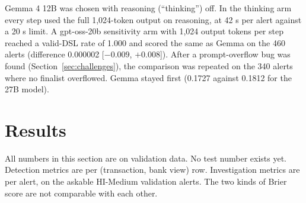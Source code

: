 \documentclass[11pt,a4paper]{article}
\begin{document}
\begin{table}[!htbp]
\centering\small
{}
\caption{Backbone sweep E18 on HI-Medium validation alerts. Brier is per alert.}
\label{tab:e18}
\end{table}

Gemma 4 12B was chosen with reasoning (``thinking'') off. In the thinking arm every step used the full 1,024-token output on reasoning, at 42 s per alert against a 20 s limit. A gpt-oss-20b sensitivity arm with 1,024 output tokens per step reached a valid-DSL rate of 1.000 and scored the same as Gemma on the 460 alerts (difference 0.000002 [$-0.009$, $+0.008$]). After a prompt-overflow bug was found (Section~\ref{sec:challenges}), the comparison was repeated on the 340 alerts where no finalist overflowed. Gemma stayed first (0.1727 against 0.1812 for the 27B model).

\section{Results}
\label{sec:results}

All numbers in this section are on validation data. No test number exists yet. Detection metrics are per (transaction, bank view) row. Investigation metrics are per alert, on the askable HI-Medium validation alerts. The two kinds of Brier score are not comparable with each other.
\end{document}
